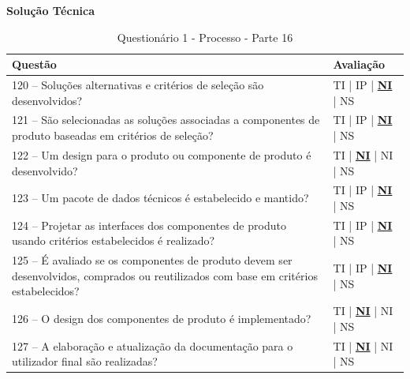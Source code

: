 \documentclass[openany,10pt,a4paper]{article}
\begin{document}
\begin{appendix}
	\begin{table}[h]
	\textbf{Solução Técnica}
	\centering
		\caption{Questionário 1 - Processo - Parte 16}
		\begin{tabular}{p{5in}p{1in}}		
			\toprule
			\textbf{Questão}  & \textbf{Avaliação}\\ 
			\midrule
			120 – Soluções alternativas e critérios de seleção são desenvolvidos?
	 & TI | IP | \underline{\textbf{NI}} | NS \\
			\midrule
			121 – São selecionadas as soluções associadas a componentes de produto baseadas em critérios 
	de seleção?
	 & TI | IP | \underline{\textbf{NI}} | NS \\
			\midrule
			122 – Um design para o produto ou componente de produto é desenvolvido?
	 & TI | \underline{\textbf{NI}} | NI | NS \\
			\midrule
			123 – Um pacote de dados técnicos é estabelecido e mantido?
	 & TI | IP | \underline{\textbf{NI}} | NS \\
			\midrule
			124 – Projetar as interfaces dos componentes de produto usando critérios estabelecidos é 
	realizado? 
	  & TI | IP | \underline{\textbf{NI}} | NS \\
			\midrule
			125 – É avaliado se os componentes de produto devem ser desenvolvidos, comprados ou 
	reutilizados com base em critérios estabelecidos? 
	 & TI | IP | \underline{\textbf{NI}} | NS \\
	 \midrule
			126 – O design dos componentes de produto é implementado?
	 & TI | \underline{\textbf{NI}} | NI | NS \\
			\midrule
			127 – A elaboração e atualização da documentação para o utilizador final são realizadas?
	 & TI | \underline{\textbf{NI}} | NI | NS \\
			\bottomrule
		\end{tabular} 
	\end{table}
	

\end{appendix}
\end{document}
